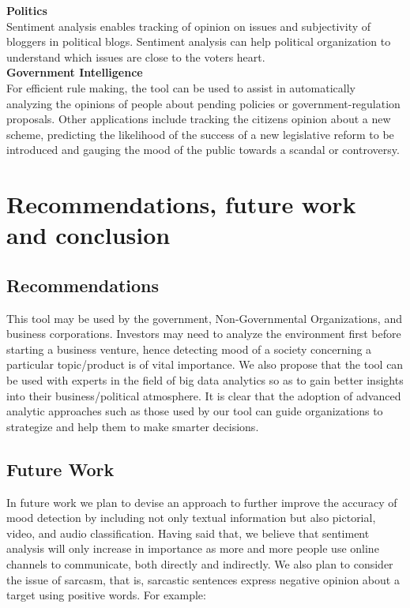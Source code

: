 \textbf{Politics}\\
Sentiment analysis enables tracking of opinion on issues and subjectivity of bloggers in
political blogs. Sentiment analysis can help political organization to understand which issues
are close to the voter\textquotesingle s heart.\\

\textbf{Government Intelligence}\\
For efficient rule making, the tool can be used to assist in automatically analyzing the opinions of
people about pending policies or government-regulation proposals. Other applications include
tracking the citizen\textquotesingle s opinion about a new scheme, predicting the likelihood of the success of a new legislative reform to be introduced and gauging the mood of the public towards a scandal
or controversy.


\chapter{Recommendations, future work and conclusion}


\section{Recommendations}

This tool may be used by the government, Non-Governmental Organizations, and business corporations. Investors may need to analyze the environment first before starting a business
venture, hence detecting mood of a society concerning a particular topic/product is of vital importance.
We also propose that the tool can be used with experts in the field of big data analytics so as to gain
better insights into their business/political atmosphere. It is clear that the adoption of advanced analytic approaches such as those used by our tool can guide organizations to  strategize and help them to make smarter decisions.\\

\section{Future Work}
In future work we plan to devise an approach to further improve the accuracy of mood detection by including not only textual information but also pictorial, video, and audio classification.
Having said that, we believe that sentiment analysis will only increase in importance as more and
more people use online channels to communicate, both directly and indirectly.
We also plan to consider the issue of sarcasm, that is, sarcastic sentences express negative opinion
about a target using positive words. For example:\\


